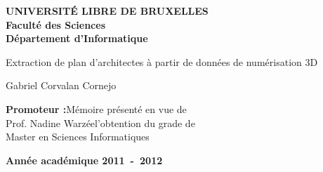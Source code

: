 \begin{titlepage}
\begin{center}
\textbf{UNIVERSIT\'E LIBRE DE BRUXELLES}\\
\textbf{Faculté des Sciences}\\
\textbf{Département d'Informatique}
\vfill{}\vfill{}

{\Huge  Extraction de plan d'architectes \vspace*{.5cm}  \linebreak[4] à partir de données de numérisation 3D}

{\Huge \par}
\begin{center}{\LARGE Gabriel Corvalan Cornejo}\end{center}{\Huge \par}
\vfill{}\vfill{}
\begin{flushright}{\large \textbf{Promoteur :}}\hfill{}{\large Mémoire présenté en vue de}\\
{\large Prof. Nadine Warzée}\hfill{}{\large l'obtention du grade de}\\
\hfill{}{\large Master en Sciences Informatiques}\end{flushright}{\large\par}
\vfill{}\vfill{}\enlargethispage{3cm}
\textbf{Année académique 2011~-~2012}
\end{center}
\end{titlepage}